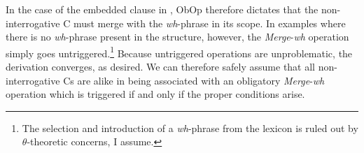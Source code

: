 \documentclass[11pt, letterpaper]{paper_nick}
\begin{document}
In the case of the embedded clause in \LLast, ObOp therefore dictates that the non-interrogative C {must} merge with the \emph{wh}-phrase in its scope. In examples where there is no \emph{wh}-phrase present in the structure, however, the \emph{Merge}-\emph{wh} operation simply goes untriggered.\footnote{The selection and introduction of a \emph{wh}-phrase from the lexicon is ruled out by $\theta$-theoretic concerns, I assume.} Because untriggered operations are unproblematic, the derivation converges, as desired.  
We can therefore safely assume that all non-interrogative Cs are alike in being associated with an obligatory \emph{Merge}-\emph{wh} operation which is triggered if and only if the proper conditions arise. %
\end{document}
